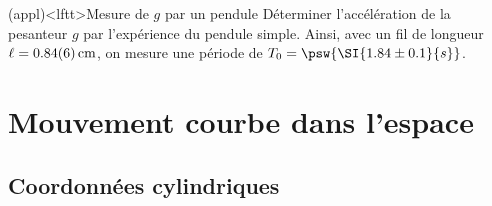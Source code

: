 \documentclass[../../main/main.tex]{subfiles}
\begin{document}
\begin{tcb*}(appl)<lftt>{Mesure de $g$ par un pendule}
	Déterminer l'accélération de la pesanteur $g$ par l'expérience du pendule
	simple.
	Ainsi, avec un fil de longueur $\ell = \SI{0.84\pm0.06}{cm}$, on mesure une
	période de $T_0 = \psw{\SI{1.84\pm0.1}{s}}$.
	\tcblower
	\vspace{-35pt}
\end{tcb*}

\section{Mouvement courbe dans l'espace}
\subsection{Coordonnées cylindriques}

\end{document}

